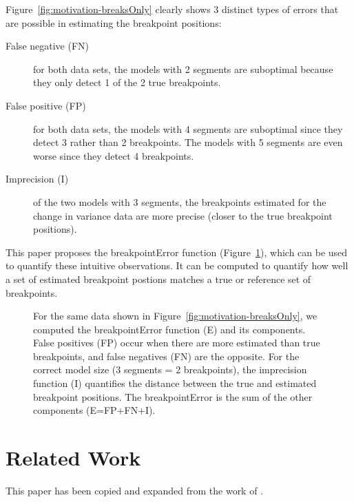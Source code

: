 \documentclass{jsfds} %
\begin{document}
\newpage

Figure~\ref{fig:motivation-breaksOnly} clearly shows 3 distinct types
of errors that are possible in estimating the breakpoint positions:
\begin{description}
\item[False negative (FN)] for both data sets, the models with 2
segments are suboptimal because they only detect 1 of the 2 true
breakpoints.
\item[False positive (FP)] for both data sets, the models with 4
  segments are suboptimal since they detect 3 rather than 2
  breakpoints. The models with 5 segments are even worse since they
  detect 4 breakpoints.
\item[Imprecision (I)] of the two models with 3 segments, the
  breakpoints estimated for the change in variance data are more
  precise (closer to the true breakpoint positions).
\end{description}

This paper proposes the breakpointError function
(Figure~\ref{fig:motivation-breakpointError}), which can be used to
quantify these intuitive observations. It can be computed to quantify
how well a set of estimated breakpoint postions matches a true or
reference set of breakpoints.


\begin{figure}[H]
  \centering
  
  \vskip -0.7cm
  \caption{For the same data shown in
    Figure~\ref{fig:motivation-breaksOnly}, we computed the
    breakpointError function (E) and its components. False positives
    (FP) occur when there are more estimated than true breakpoints,
    and false negatives (FN) are the opposite. For the correct model
    size (3 segments = 2 breakpoints), the imprecision function (I)
    quantifies the distance between the true and estimated breakpoint
    positions. The breakpointError is the sum of the other components
    (E=FP+FN+I).}
  \label{fig:motivation-breakpointError}
\end{figure}



\newpage

\section{Related Work}

This paper has been copied and expanded from the work of
\citet{HOCKING-phd-ch4}.
\end{document}
